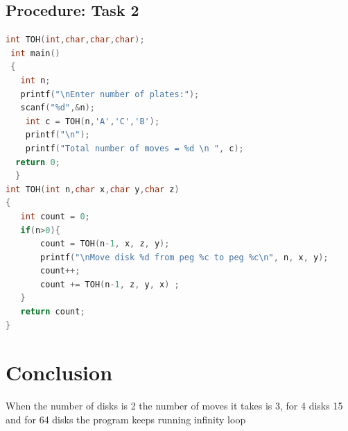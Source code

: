 \documentclass[11pt]{article}            %
\begin{document}
\subsection{Procedure: Task 2 }     

\begin{lstlisting}[language=C++]
int TOH(int,char,char,char);
 int main()
 {
   int n;
   printf("\nEnter number of plates:");
   scanf("%d",&n);
    int c = TOH(n,'A','C','B');
    printf("\n");
    printf("Total number of moves = %d \n ", c);
  return 0;
  }
int TOH(int n,char x,char y,char z)
{
   int count = 0;
   if(n>0){
       count = TOH(n-1, x, z, y);
       printf("\nMove disk %d from peg %c to peg %c\n", n, x, y);
       count++;
       count += TOH(n-1, z, y, x) ;
   }
   return count;
}
\end{lstlisting}

\section{Conclusion}  

 When the number of disks is 2 the number of moves it takes is 3, for 4 disks 15 and for 64 disks the program keeps running infinity loop
\end{document}
